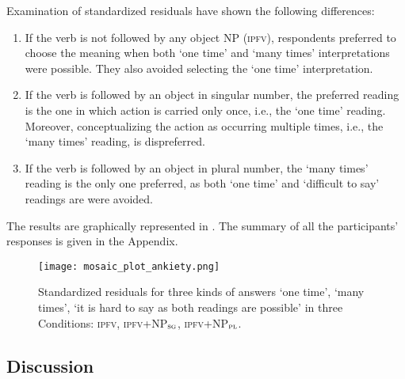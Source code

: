 \documentclass[output=paper]{langscibook}
\begin{document}
Examination of standardized residuals have shown the following differences:

\begin{enumerate}
\item If the verb is not followed by any object NP (\textsc{ipfv}), respondents preferred to choose the meaning when both ‘one time’ and ‘many times’ interpretations were possible. They also avoided selecting the ‘one time’ interpretation.
\item If the verb is followed by an object in singular number, the preferred reading is the one in which action is carried only once, i.e., the ‘one time' reading. Moreover, conceptualizing the action as occurring multiple times, i.e., the ‘many times' reading, is dispreferred.
\item If the verb is followed  by an object in plural number, the ‘many times’ reading is the only one preferred, as both ‘one time’ and ‘difficult to say’ readings are were avoided.
\end{enumerate}

The results are graphically represented in . The summary of all the participants’ responses is given in the Appendix.

\begin{figure}
\centering
\texttt{[image: mosaic\_plot\_ankiety.png]}
\caption{Standardized residuals for three kinds of answers ‘one time’, ‘many times’, ‘it is hard to say as both readings are possible’ in three Conditions: \textsc{ipfv}, \textsc{ipfv}+NP$_\textsc{sg}$, \textsc{ipfv}+NP$_\textsc{pl}$.}\label{jan-bla:fansb:kb:fig1}
\end{figure}

\subsection{Discussion}\label{jan-bla:fansb:kb:sec3.3}
\end{document}
